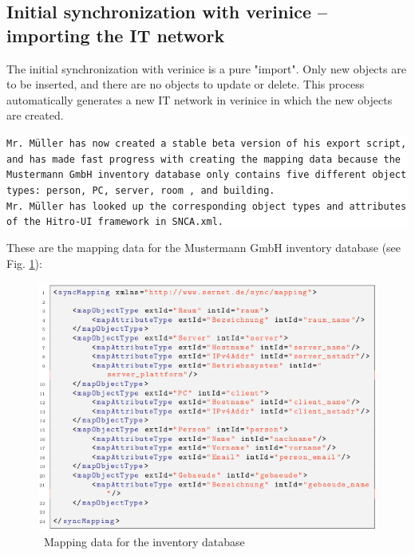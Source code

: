 \documentclass[a4paper,10pt]{book}
\begin{document}
\subsection{ Initial synchronization with verinice – importing the IT network}
The initial synchronization with verinice is a pure "import". Only new objects are to be inserted, and there
are no objects to update or delete. This process automatically generates a new IT network in verinice in which
the new objects are created.
\newline\newline
\colorbox{white}{\parbox{\textwidth}{
{\tt Mr. Müller has now created a stable beta version of his export script, and has made fast progress with creating
the mapping data because the Mustermann GmbH inventory database only contains five different object types: person,
PC, server, room , and building.
\newline\\
Mr. Müller has looked up the corresponding object types and attributes of the Hitro-UI framework in SNCA.xml.}
}}
\newline\newline
These are the mapping data for the Mustermann GmbH inventory database (see Fig. \ref{Mapping data for the inventory database}):
\newline
\begin{figure}[htb!]
  \centering
  \includegraphics[scale=.7]{Screenshot/SyncAPI_Fallstudie_03-en.png}
  \caption{\label{Mapping data for the inventory database} \ Mapping data for the inventory database}
\end{figure}
\newline
\end{document}
